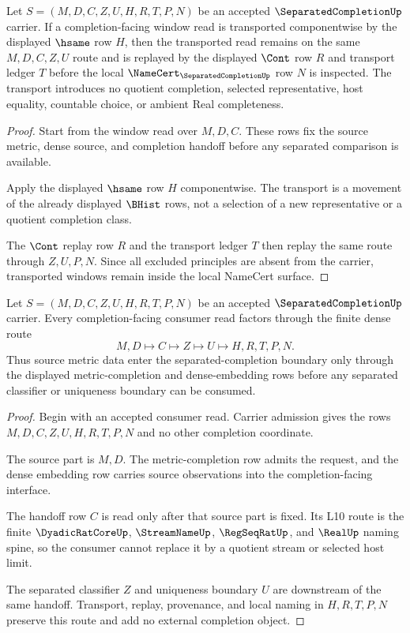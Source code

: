 \begin{theorem}
\label{thm:separated-completion-window-transport}
Let $S=(M,D,C,Z,U,H,R,T,P,N)$ be an accepted $\SeparatedCompletionUp$ carrier. If a completion-facing window read is transported componentwise by the displayed $\hsame$ row $H$, then the transported read remains on the same $M,D,C,Z,U$ route and is replayed by the displayed $\Cont$ row $R$ and transport ledger $T$ before the local $\NameCert_{\SeparatedCompletionUp}$ row $N$ is inspected. The transport introduces no quotient completion, selected representative, host equality, countable choice, or ambient Real completeness.
\end{theorem}
\begin{proof}
Start from the window read over $M,D,C$. These rows fix the source metric, dense source, and completion handoff before any separated comparison is available.

Apply the displayed $\hsame$ row $H$ componentwise. The transport is a movement of the already displayed $\BHist$ rows, not a selection of a new representative or a quotient completion class.

The $\Cont$ replay row $R$ and the transport ledger $T$ then replay the same route through $Z,U,P,N$. Since all excluded principles are absent from the carrier, transported windows remain inside the local NameCert surface.
\end{proof}

\begin{theorem}
\label{thm:separated-completion-dense-factorization}
Let $S=(M,D,C,Z,U,H,R,T,P,N)$ be an accepted $\SeparatedCompletionUp$ carrier. Every completion-facing consumer read factors through the finite dense route
$$
M,D\longmapsto C\longmapsto Z\longmapsto U\longmapsto H,R,T,P,N .
$$
Thus source metric data enter the separated-completion boundary only through the displayed metric-completion and dense-embedding rows before any separated classifier or uniqueness boundary can be consumed.
\end{theorem}
\begin{proof}
Begin with an accepted consumer read. Carrier admission gives the rows $M,D,C,Z,U,H,R,T,P,N$ and no other completion coordinate.

The source part is $M,D$. The metric-completion row admits the request, and the dense embedding row carries source observations into the completion-facing interface.

The handoff row $C$ is read only after that source part is fixed. Its L10 route is the finite $\DyadicRatCoreUp$, $\StreamNameUp$, $\RegSeqRatUp$, and $\RealUp$ naming spine, so the consumer cannot replace it by a quotient stream or selected host limit.

The separated classifier $Z$ and uniqueness boundary $U$ are downstream of the same handoff. Transport, replay, provenance, and local naming in $H,R,T,P,N$ preserve this route and add no external completion object.
\end{proof}

